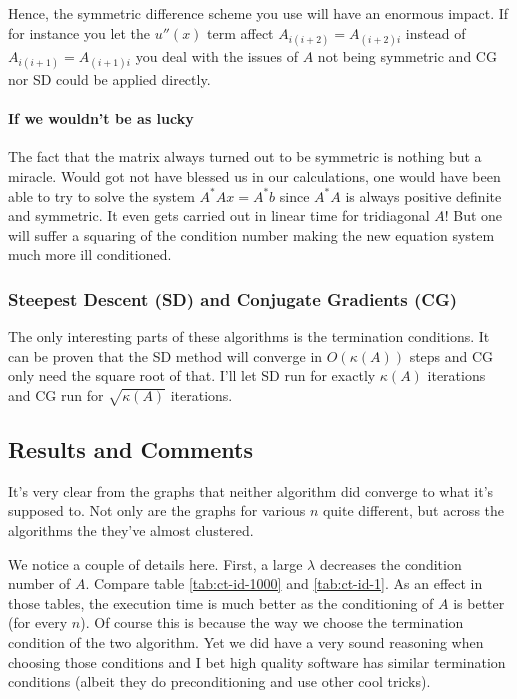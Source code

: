 \documentclass[a4paper,11pt]{article}
\begin{document}
Hence, the symmetric difference scheme you use will have an enormous
impact. If for instance you let the $u''(x)$ term affect
$A_{i(i+2)}=A_{(i+2)i}$ instead of $A_{i(i+1)}=A_{(i+1)i}$ you deal with
the issues of $A$ not being symmetric and CG nor SD could be applied
directly.

\paragraph{If we wouldn't be as lucky}

The fact that the matrix always turned out to be symmetric is nothing
but a miracle. Would got not have blessed us in our calculations, one
would have been able to try to solve the system $A^{*}Ax=A^{*}b$ since
$A^*A$ is always positive definite and symmetric.  It even gets carried
out in linear time for tridiagonal $A$! But one will suffer a squaring
of the condition number making the new equation system much more ill
conditioned.

\subsubsection{Steepest Descent (SD) and Conjugate Gradients (CG)}

The only interesting parts of these algorithms is the termination
conditions. It can be proven that the SD method will converge in
$O(\kappa(A))$ steps and CG only need the square root of that.
I'll let SD run for exactly $\kappa(A)$ iterations and CG run for
$\sqrt{\kappa(A)}$ iterations.

\subsection{Results and Comments}

It's very clear from the graphs that neither algorithm did converge to
what it's supposed to. Not only are the graphs for various $n$ quite
different, but across the algorithms the they've almost clustered.

We notice a couple of details here. First, a large $\lambda$ decreases the
condition number of $A$. Compare table \ref{tab:ct-id-1000} and
\ref{tab:ct-id-1}. As an effect in those tables, the execution time is
much better as the conditioning of $A$ is better (for every $n$). Of
course this is because the way we choose the termination condition of
the two algorithm. Yet we did have a very sound reasoning when choosing
those conditions and I bet high quality software has similar termination
conditions (albeit they do preconditioning and use other cool tricks).
\end{document}
